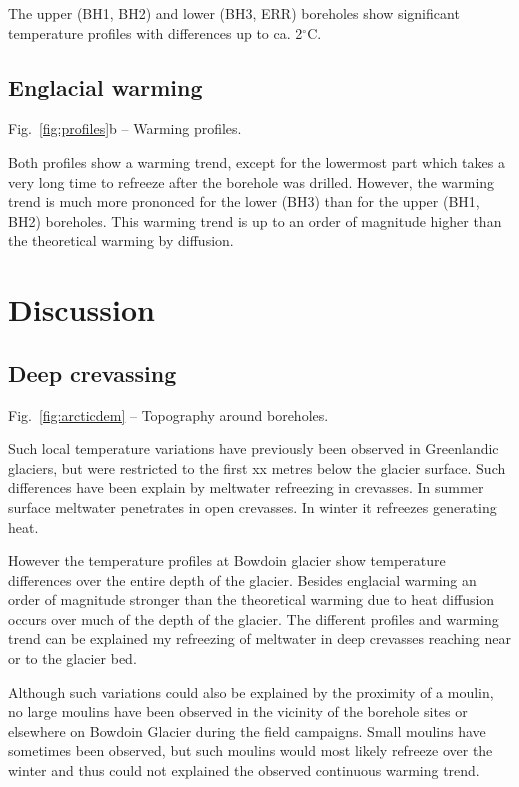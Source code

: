 \documentclass[utf8]{article}
\begin{document}
    The upper (BH1, BH2) and lower (BH3, ERR) boreholes show significant
    temperature profiles with differences up to ca. 2$^\circ$C.

\subsection{Englacial warming}

    Fig.~\ref{fig:profiles}b -- Warming profiles.

    Both profiles show a warming trend, except for the lowermost part which
    takes a very long time to refreeze after the borehole was drilled.
    However, the warming trend is much more prononced for the lower (BH3) than
    for the upper (BH1, BH2) boreholes. This warming trend is up to an order of
    magnitude higher than the theoretical warming by diffusion.


\section{Discussion}

\subsection{Deep crevassing}

    Fig.~\ref{fig:arcticdem} -- Topography around boreholes.

    Such local temperature variations have previously been observed in
    Greenlandic glaciers, but were restricted to the first xx metres below
    the glacier surface. Such differences have been explain by meltwater
    refreezing in crevasses. In summer surface meltwater penetrates in open
    crevasses. In winter it refreezes generating heat.

    However the temperature profiles at Bowdoin glacier show temperature
    differences over the entire depth of the glacier. Besides englacial warming
    an order of magnitude stronger than the theoretical warming due to heat
    diffusion occurs over much of the depth of the glacier. The different
    profiles and warming trend can be explained my refreezing of meltwater
    in deep crevasses reaching near or to the glacier bed.

    Although such variations could also be explained by the proximity of a
    moulin, no large moulins have been observed in the vicinity of the borehole
    sites or elsewhere on Bowdoin Glacier during the field campaigns. Small
    moulins have sometimes been observed, but such moulins would most likely
    refreeze over the winter and thus could not explained the observed
    continuous warming trend.
\end{document}

